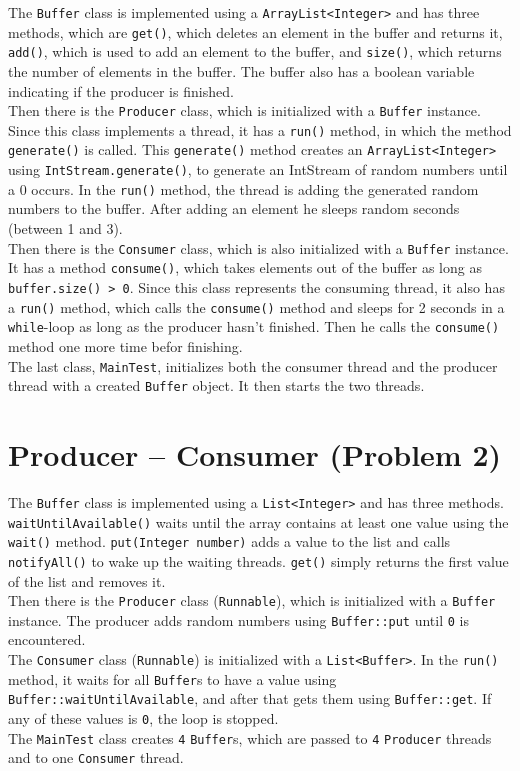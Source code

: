 \documentclass{article}
\begin{document}
  The \texttt{Buffer} class is implemented using a \texttt{ArrayList<Integer>} and has three methods, which are \texttt{get()}, which deletes an element in the buffer and returns it, \texttt{add()}, which is used to add an element to the buffer, and \texttt{size()}, which returns the number of elements in the buffer. The buffer also has a boolean variable indicating if the producer is finished.\\
  Then there is the \texttt{Producer} class, which is initialized with a \texttt{Buffer} instance. Since this class implements a thread, it has a \texttt{run()} method, in which the method \texttt{generate()} is called. This \texttt{generate()} method creates an \texttt{ArrayList<Integer>} using \texttt{IntStream.generate()}, to generate an IntStream of random numbers until a 0 occurs. In the \texttt{run()} method, the thread is adding the generated random numbers to the buffer. After adding an element he sleeps random seconds (between 1 and 3).\\
  Then there is the \texttt{Consumer} class, which is also initialized with a \texttt{Buffer} instance. It has a method \texttt{consume()}, which takes elements out of the buffer as long as \texttt{buffer.size() > 0}. Since this class represents the consuming thread, it also has a \texttt{run()} method, which calls the \texttt{consume()} method and sleeps for 2 seconds in a \texttt{while}-loop as long as the producer hasn't finished. Then he calls the \texttt{consume()} method one more time befor finishing.\\
  The last class, \texttt{MainTest}, initializes both the consumer thread and the producer thread with a created \texttt{Buffer} object. It then starts the two threads.\\

  \section{Producer – Consumer (Problem 2)}

  The \texttt{Buffer} class is implemented using a \texttt{List<Integer>} and has three methods. \texttt{waitUntilAvailable()} waits until the array contains at least one value using the \texttt{wait()} method. \texttt{put(Integer number)} adds a value to the list and calls \texttt{notifyAll()} to wake up the waiting threads. \texttt{get()} simply returns the first value of the list and removes it.\\
  Then there is the \texttt{Producer} class (\texttt{Runnable}), which is initialized with a \texttt{Buffer} instance. The producer adds random numbers using \texttt{Buffer::put} until \texttt{0} is encountered.\\
  The \texttt{Consumer} class (\texttt{Runnable}) is initialized with a \texttt{List<Buffer>}. In the \texttt{run()} method, it waits for all \texttt{Buffer}s to have a value using \texttt{Buffer::waitUntilAvailable}, and after that gets them using \texttt{Buffer::get}. If any of these values is \texttt{0}, the loop is stopped.\\
  The \texttt{MainTest} class creates \texttt{4} \texttt{Buffer}s, which are passed to \texttt{4} \texttt{Producer} threads and to one \texttt{Consumer} thread.
\end{document}
